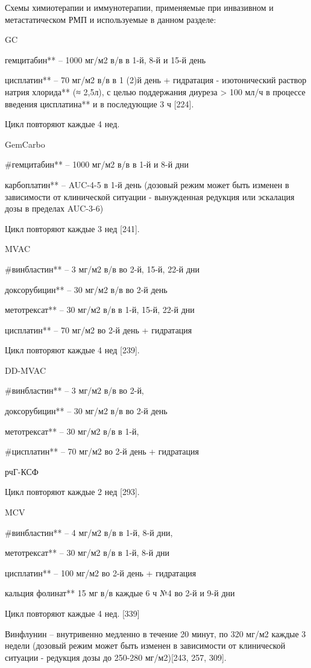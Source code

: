 Схемы химиотерапии и иммунотерапии, применяемые при инвазивном и метастатическом РМП и используемые в данном разделе:

GC

гемцитабин** – 1000 мг/м2 в/в в 1-й, 8-й и 15-й день 

цисплатин** – 70 мг/м2 в/в в 1 (2)й день + гидратация - изотонический раствор натрия хлорида** (≈ 2,5л), с целью поддержания диуреза > 100 мл/ч в процессе введения цисплатина** и в последующие 3 ч [224].

Цикл повторяют каждые 4 нед.

GemCarbo

#гемцитабин** – 1000 мг/м2 в/в в 1-й и 8-й дни

карбоплатин** – AUC-4-5 в 1-й день (дозовый режим может быть изменен в зависимости от клинической ситуации - вынужденная редукция или эскалация дозы в пределах AUC-3-6)

Цикл повторяют каждые 3 нед [241].

MVAC

#винбластин** – 3 мг/м2 в/в во 2-й, 15-й, 22-й дни 

доксорубицин** – 30 мг/м2 в/в во 2-й день 

метотрексат** – 30 мг/м2 в/в в 1-й, 15-й, 22-й дни 

цисплатин** – 70 мг/м2 во 2-й день + гидратация 

Цикл повторяют каждые 4 нед [239].

DD-MVAC

#винбластин** – 3 мг/м2 в/в во 2-й, 

доксорубицин** – 30 мг/м2 в/в во 2-й день 

метотрексат** – 30 мг/м2 в/в в 1-й, 

#цисплатин** – 70 мг/м2 во 2-й день + гидратация 

рчГ-КСФ

Цикл повторяют каждые 2 нед [293].

MCV

#винбластин** – 4 мг/м2 в/в в 1-й, 8-й дни,

метотрексат** – 30 мг/м2 в/в в 1-й, 8-й дни 

цисплатин** – 100 мг/м2 во 2-й день + гидратация 

кальция фолинат** 15 мг в/в каждые 6 ч №4 во 2-й и 9-й дни

Цикл повторяют каждые 4 нед. [339]

Винфлунин – внутривенно медленно в течение 20 минут, по 320 мг/м2 каждые 3 недели (дозовый режим может быть изменен в зависимости от клинической ситуации - редукция дозы до 250-280 мг/м2)[243, 257, 309].

